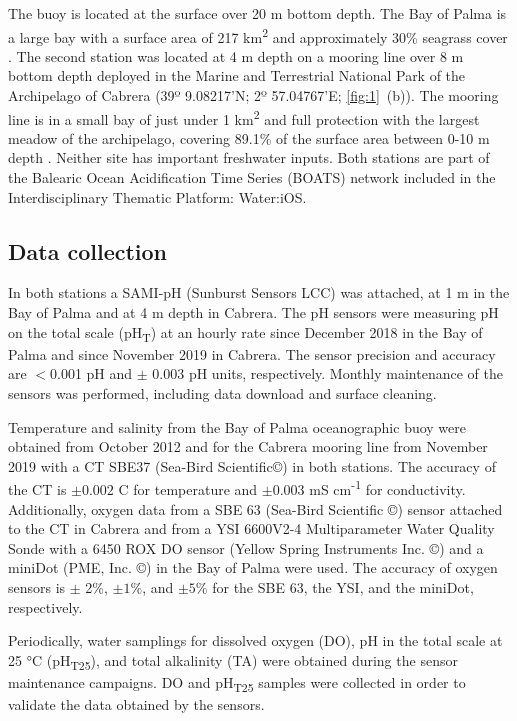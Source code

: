 The buoy is located at the surface over 20 m bottom depth. The Bay of Palma is
a large bay with a
surface area of 217 km\textsuperscript{2} and approximately 30\% seagrass
cover \cite{gazeau2005whole}. The second station was located at 4 m depth on a
mooring line over 8 m bottom depth deployed in the Marine and Terrestrial
National Park of the Archipelago of Cabrera (39º 9.08217’N; 2º 57.04767’E;
\cref{fig:1}~\textcolor{ref_color}{(b)}). The mooring line is in a small bay of
just under 1 km\textsuperscript{2} and full protection with the largest meadow
of the
archipelago, covering 89.1\% of the surface area between 0-10 m
depth \cite{marba2002effectiveness}. Neither site has important freshwater
inputs. Both stations are part of the Balearic Ocean Acidification Time Series
(BOATS) network included in the Interdisciplinary Thematic Platform: Water:iOS.

\subsection{Data collection}
In both stations a SAMI-pH (Sunburst Sensors LCC) was attached, at 1 m in
the Bay of Palma and at 4 m depth in Cabrera. The pH sensors were measuring pH
on the total scale (pH\textsubscript{T}) at an hourly rate since December 2018
in the Bay of Palma and since November 2019 in Cabrera. The sensor precision
and accuracy are $<$0.001 pH and $\pm$ 0.003 pH units, respectively. Monthly
maintenance of the sensors was performed, including data download and surface
cleaning.

Temperature and salinity from the Bay of Palma oceanographic buoy were
obtained from October 2012 and for the Cabrera mooring line from November 2019
with a CT SBE37 (Sea-Bird Scientific©) in both stations. The accuracy of the CT
is $± 0.002$ \textdegree C for temperature and $± 0.003$ mS
cm\textsuperscript{-1} for conductivity. Additionally, oxygen data from a SBE
63 (Sea-Bird Scientific ©) sensor attached to the CT in Cabrera and from a YSI
6600V2-4 Multiparameter Water Quality Sonde with a 6450 ROX DO sensor (Yellow
Spring Instruments Inc. ©) \cite{tintore2022} and a miniDot (PME, Inc. ©) in
the Bay of Palma were used. The accuracy of oxygen sensors is $\pm$ 2\%, $\pm
    1\%$, and $\pm 5\%$ for the SBE 63, the YSI, and the miniDot, respectively.

Periodically, water samplings for dissolved oxygen (DO), pH in the total scale
at 25 °C (pH\textsubscript{T25}), and total alkalinity (TA) were obtained
during the sensor maintenance campaigns. DO and pH\textsubscript{T25} samples
were collected in order to validate the data obtained by the sensors.

